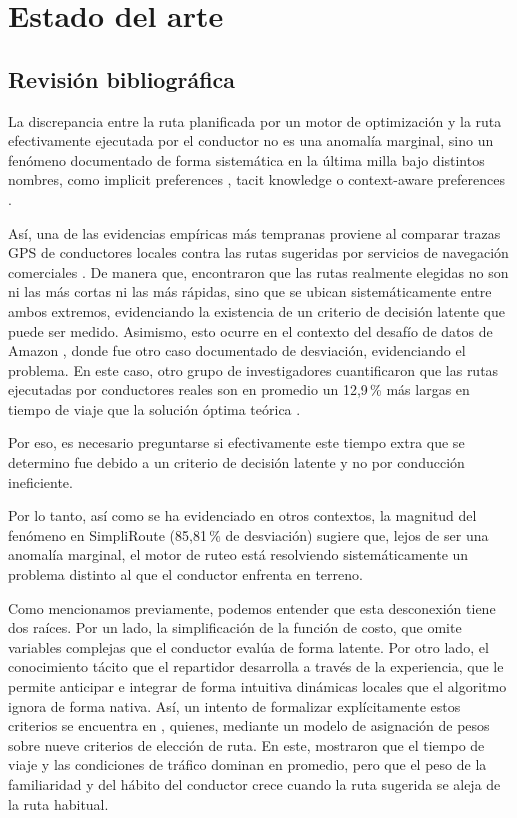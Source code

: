 
\chapter{Estado del arte} %
\label{sec:Estado Arte} %



\section{Revisión bibliográfica}

La discrepancia entre la ruta planificada por un motor de optimización y la ruta efectivamente ejecutada por el conductor no es una anomalía marginal, sino un fenómeno documentado de forma sistemática en la última milla bajo distintos nombres, como implicit preferences \cite{canoy2023learn}, tacit knowledge \cite{merchan20242021} o context-aware preferences \cite{cook2024constrained}. 

Así, una de las evidencias empíricas más tempranas proviene al comparar trazas GPS de conductores locales contra las rutas sugeridas por servicios de navegación comerciales \cite{ceikute2013routing}. De manera que, encontraron que las rutas realmente elegidas no son ni las más cortas ni las más rápidas, sino que se ubican sistemáticamente entre ambos extremos, evidenciando la existencia de un criterio de decisión latente que puede ser medido. Asimismo, esto ocurre en el contexto del desafío de datos de Amazon \cite{merchan20242021}, donde fue otro caso documentado de desviación, evidenciando el problema. En este caso, otro grupo de investigadores cuantificaron que las rutas ejecutadas por conductores reales son en promedio un 12,9\,\% más largas en tiempo de viaje que la solución óptima teórica \cite{cook2024constrained}.

Por eso, es necesario preguntarse si efectivamente este tiempo extra que se determino fue debido a un criterio de decisión latente y  no por conducción ineficiente.

Por lo tanto, así como se ha evidenciado en otros contextos, la magnitud del fenómeno en SimpliRoute (85,81\,\% de desviación) sugiere que, lejos de ser una anomalía marginal, el motor de ruteo está resolviendo sistemáticamente un problema distinto al que el conductor enfrenta en terreno.

Como mencionamos previamente, podemos entender que esta desconexión tiene dos raíces. Por un lado, la simplificación de la función de costo, que omite variables complejas que el conductor evalúa de forma latente. Por otro lado, el conocimiento tácito que el repartidor desarrolla a través de la experiencia, que le permite anticipar e integrar de forma intuitiva dinámicas locales que el algoritmo ignora de forma nativa. Así, un intento de formalizar explícitamente estos criterios se encuentra en , quienes, mediante un modelo de asignación de pesos sobre nueve criterios de elección de ruta. En este, mostraron que el tiempo de viaje y las condiciones de tráfico dominan en promedio, pero que el peso de la familiaridad y del hábito del conductor crece cuando la ruta sugerida se aleja de la ruta habitual.


